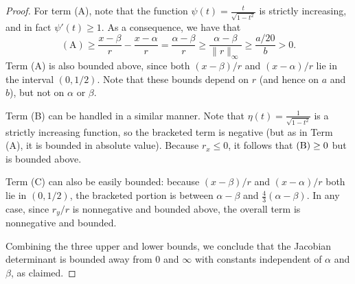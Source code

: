 \documentclass[12pt]{amsart}
\theoremstyle{definition}
\numberwithin{equation}{section}
\begin{document}
\begin{proof}
For term (A), note that the function $\psi(t) = \frac{t}{\sqrt{1 - t^2}}$ is strictly increasing, and in fact $\psi'(t) \ge 1$. As a consequence, we have that
$$(\text{A}) \ge \frac{x - \beta}{r} - \frac{x - \alpha}{r} = \frac{\alpha - \beta}{r} \ge \frac{\alpha - \beta}{\|r\|_{\infty}} \ge \frac{a/20}{b} >  0.$$
Term (A) is also bounded above, since both $(x - \beta)/r$ and $(x - \alpha)/r$ lie in the interval $(0, 1/2)$. Note that these bounds depend on $r$ (and hence on $a$ and $b$), but not on $\alpha$ or $\beta$. 

Term (B) can be handled in a similar manner. Note that $\eta(t) = \frac{1}{\sqrt{1 - t^2}}$ is a strictly increasing function, so the bracketed term is negative (but as in Term (A), it is bounded in absolute value). Because $r_x \le 0$, it follows that $(\text B) \ge 0$ but is bounded above.

Term (C) can also be easily bounded: because $(x - \beta)/r$ and $(x - \alpha)/r$ both lie in $(0, 1/2)$, the bracketed portion is between $\alpha - \beta$ and $\frac 4 3 (\alpha - \beta)$. In any case, since $r_y/r$ is nonnegative and bounded above, the overall term is nonnegative and bounded. 

Combining the three upper and lower bounds, we conclude that the Jacobian determinant is bounded away from $0$ and $\infty$ with constants independent of $\alpha$ and $\beta$, as claimed. 
\end{proof}
\end{document}
